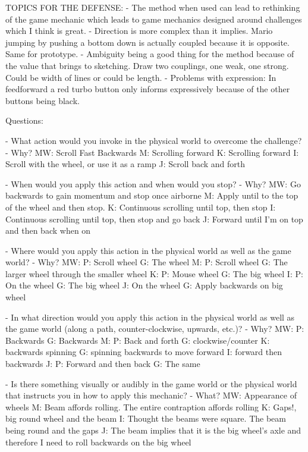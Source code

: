 TOPICS FOR THE DEFENSE:
- The method when used can lead to rethinking of the game mechanic which leads to game mechanics designed around challenges which I think is great.
- Direction is more complex than it implies. Mario jumping by pushing a bottom down is actually coupled because it is opposite. Same for prototype.
- Ambiguity being a good thing for the method because of the value that brings to sketching. Draw two couplings, one weak, one strong. Could be width of lines or could be length.
- Problems with expression: In feedforward a red turbo button only informs expressively because of the other buttons being black.




 Questions:

  - What action would you invoke in the physical world to overcome the challenge?
   - Why?
   MW: Scroll Fast Backwards
   M: Scrolling forward
   K: Scrolling forward
   I: Scroll with the wheel, or use it as a ramp
   J: Scroll back and forth

    - When would you apply this action and when would you stop?
     - Why?
   MW: Go backwards to gain momentum and stop once airborne
   M: Apply until to the top of the wheel and then stop.
   K: Continuous scrolling until top, then stop
   I: Continuous scrolling until top, then stop and go back
   J: Forward until I'm on top and then back when on

    - Where would you apply this action in the physical world as well as the game world?
     - Why?
   MW: P: Scroll wheel G: The wheel
   M: P: Scroll wheel G: The larger wheel through the smaller wheel
   K: P: Mouse wheel G: The big wheel
   I: P: On the wheel G: The big wheel
   J: On the wheel G: Apply backwards on big wheel

    - In what direction would you apply this action in the physical world as well as the game world (along a path, counter-clockwise, upwards, etc.)?
     - Why?
   MW: P: Backwards G: Backwards
   M: P: Back and forth G: clockwise/counter
   K: backwards spinning G: spinning backwards to move forward
   I: forward then backwards
   J: P: Forward and then back G: The same

    - Is there something visually or audibly in the game world or the physical world that instructs you in how to apply this mechanic?
     - What?
   MW: Appearance of wheels
   M: Beam affords rolling. The entire contraption affords rolling
   K: Gaps!, big round wheel and the beam
   I: Thought the beams were square. The beam being round and the gaps
   J: The beam implies that it is the big wheel's axle and therefore I need to roll backwards on the big wheel

